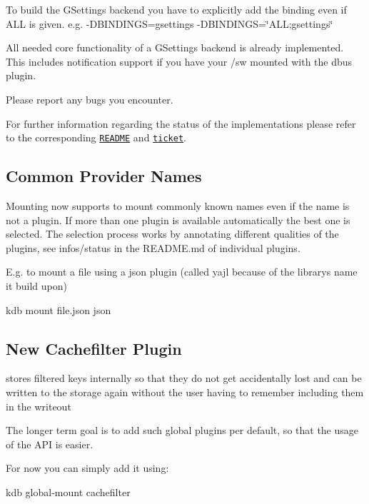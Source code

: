 To build the G\+Settings backend you have to explicitly add the binding even if {\ttfamily A\+LL} is given. e.\+g. {\ttfamily -\/\+D\+B\+I\+N\+D\+I\+N\+GS=gsettings} {\ttfamily -\/\+D\+B\+I\+N\+D\+I\+N\+GS=\char`\"{}\+A\+L\+L;gsettings\char`\"{}}

All needed core functionality of a G\+Settings backend is already implemented. This includes notification support if you have your {\ttfamily /sw} mounted with the dbus plugin.

Please report any bugs you encounter.

For further information regarding the status of the implementations please refer to the corresponding \href{https://github.com/elektrainitiative/libelektra/tree/master/src/bindings/gsettings}{\tt R\+E\+A\+D\+ME} and \href{https://github.com/ElektraInitiative/libelektra/issues/775}{\tt ticket}.

\subsection*{Common Provider Names}

Mounting now supports to mount commonly known names even if the name is not a plugin. If more than one plugin is available automatically the best one is selected. The selection process works by annotating different qualities of the plugins, see {\ttfamily infos/status} in the R\+E\+A\+D\+M\+E.\+md of individual plugins.

E.\+g. to mount a file using a json plugin (called yajl because of the library\textquotesingle{}s name it build upon) \begin{DoxyVerb}kdb mount file.json json
\end{DoxyVerb}


\subsection*{New Cachefilter Plugin}

stores filtered keys internally so that they do not get accidentally lost and can be written to the storage again without the user having to remember including them in the writeout

The longer term goal is to add such global plugins per default, so that the usage of the A\+PI is easier.

For now you can simply add it using\+: \begin{DoxyVerb} kdb global-mount cachefilter
\end{DoxyVerb}


